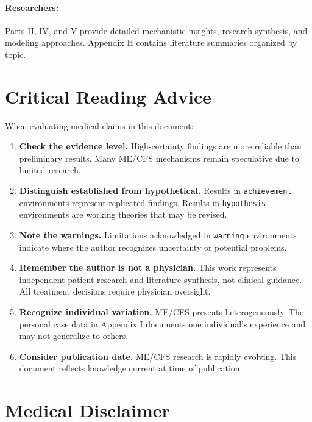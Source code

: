 \paragraph{Researchers:} Parts II, IV, and V provide detailed mechanistic insights, research synthesis, and modeling approaches. Appendix H contains literature summaries organized by topic.

\section*{Critical Reading Advice}

When evaluating medical claims in this document:

\begin{enumerate}
\item \textbf{Check the evidence level.} High-certainty findings are more reliable than preliminary results. Many ME/CFS mechanisms remain speculative due to limited research.

\item \textbf{Distinguish established from hypothetical.} Results in \texttt{achievement} environments represent replicated findings. Results in \texttt{hypothesis} environments are working theories that may be revised.

\item \textbf{Note the warnings.} Limitations acknowledged in \texttt{warning} environments indicate where the author recognizes uncertainty or potential problems.

\item \textbf{Remember the author is not a physician.} This work represents independent patient research and literature synthesis, not clinical guidance. All treatment decisions require physician oversight.

\item \textbf{Recognize individual variation.} ME/CFS presents heterogeneously. The personal case data in Appendix I documents one individual's experience and may not generalize to others.

\item \textbf{Consider publication date.} ME/CFS research is rapidly evolving. This document reflects knowledge current at time of publication.
\end{enumerate}

\section*{Medical Disclaimer}

